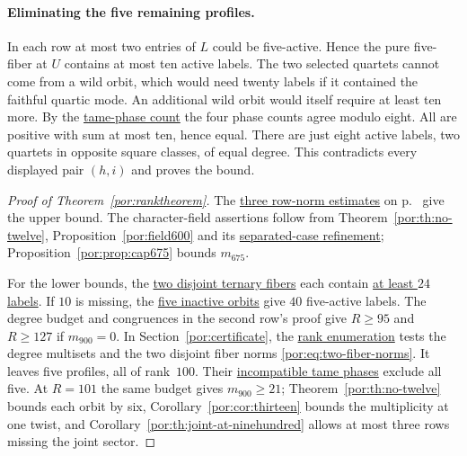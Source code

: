 \documentclass[11pt,a4paper]{article}
\numberwithin{equation}{section}
\theoremstyle{remark}
\begin{document}
\paragraph{Eliminating the five remaining profiles.}\label{por:five-survivors}
In each row at most two entries of $L$ could be five-active. Hence the pure five-fiber at $U$ contains at most ten active labels. The two selected quartets cannot come from a wild orbit, which would need twenty labels if it contained the faithful quartic mode. An additional wild orbit would itself require at least ten more. By the \hyperref[por:tame-fiber-masses]{tame-phase count} the four phase counts agree modulo eight. All are positive with sum at most ten, hence equal. There are just eight active labels, two quartets in opposite square classes, of equal degree. This contradicts every displayed pair $(h,i)$ and proves the bound. 

\begin{proof}[Proof of Theorem~\ref{por:ranktheorem}]
The \hyperref[por:rank-upper]{three row-norm estimates} on p.~\pageref{por:rank-upper} give the upper bound. The character-field assertions follow from Theorem~\ref{por:th:no-twelve}, Proposition~\ref{por:field600} and its \hyperref[por:field600-sep]{separated-case refinement}; Proposition~\ref{por:prop:cap675} bounds $m_{675}$.

For the lower bounds, the \hyperref[por:two-ternary-fibers]{two disjoint ternary fibers} each contain \hyperref[por:24-joint]{at least $24$ labels}. If $10$ is missing, the \hyperref[por:five-inactive-orbits]{five inactive orbits} give $40$ five-active labels. The degree budget and congruences in the second row's proof give $R\ge95$ and $R\ge127$ if $m_{900}=0$. In Section~\ref{por:certificate}, the \href{https://github.com/sebastienpalcoux/WGT-fusion-categories/blob/f7f9f9a02f3116e61eb9dca4eebfed77001494e8/code/check_frontier_rank.py}{rank enumeration} tests the degree multisets and the two disjoint fiber norms \eqref{por:eq:two-fiber-norms}. It leaves five profiles, all of rank~$100$. Their \hyperref[por:five-survivors]{incompatible tame phases} exclude all five. At $R=101$ the same budget gives $m_{900}\ge21$; Theorem~\ref{por:th:no-twelve} bounds each orbit by six, Corollary~\ref{por:cor:thirteen} bounds the multiplicity at one twist, and Corollary~\ref{por:th:joint-at-ninehundred} allows at most three rows missing the joint sector.
\end{proof}
\end{document}
